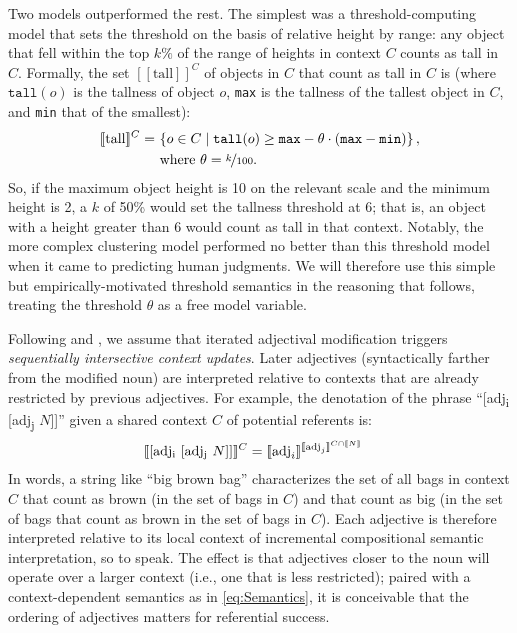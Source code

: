 \documentclass[10pt,a4paper]{article}
\newcommand{\den}[1]{\ensuremath{[\![#1]\!]}}
\begin{document}
Two models outperformed the rest. The simplest was a threshold-computing model that sets the threshold on the basis of relative height by range: any object that fell within the top $k\%$ of the range of heights in context $C$ counts as tall in $C$. Formally, the set $\den{\text{tall}}^C$ of objects in $C$ that count as tall in $C$ is (where $\texttt{tall}(o)$ is the tallness of object $o$, \texttt{max} is the tallness of the tallest object in $C$, and \texttt{min} that of the smallest):
\begin{align}
  \label{eq:Semantics}
  \den{\text{tall}}^C  = & \ \{ o \in C \mid \texttt{tall}(o) \ge \texttt{max} - \theta \cdot (\texttt{max} - \texttt{min}) \} \,, \\
  & \text{ where $\theta = \nicefrac{k}{100}$.} \nonumber
\end{align}
So, if the maximum object height is 10 on the relevant scale and the minimum height is 2, a $k$ of 50\% would set the tallness threshold at 6; that is, an object with a height greater than 6 would count as tall in that context. Notably, the more complex clustering model performed no better than this threshold model when it came to predicting human judgments. We will therefore use this simple but empirically-motivated threshold semantics in the reasoning that follows, treating the threshold $\theta$ as a free model variable.

Following  and , we assume that iterated adjectival modification triggers \emph{sequentially intersective context updates}. Later adjectives (syntactically farther from the modified noun) are interpreted relative to contexts that are already restricted by previous adjectives. For example, the denotation of the phrase ``[adj\textsubscript{i} [adj\textsubscript{j} $N$]]'' given a shared context $C$ of potential referents is:
\begin{align}
  \label{eq:SequentialInterpretation}
  \den{\text{[adj\textsubscript{i} [adj\textsubscript{j} $N$]]}}^{C} & = \den{\text{adj}_i}^{\den{\text{adj}_j}^{C\cap \den{N}}} 
\end{align} 
In words, a string like ``big brown bag'' characterizes the set of all bags in context $C$ that count as brown (in the set of bags in $C$) and that count as big (in the set of bags that count as brown in the set of bags in $C$). Each adjective is therefore interpreted relative to its local context of incremental compositional semantic interpretation, so to speak. The effect is that adjectives closer to the noun will operate over a larger context (i.e., one that is less restricted); paired with a context-dependent semantics as in \eqref{eq:Semantics}, it is conceivable that the ordering of adjectives matters for referential success.
\end{document}
